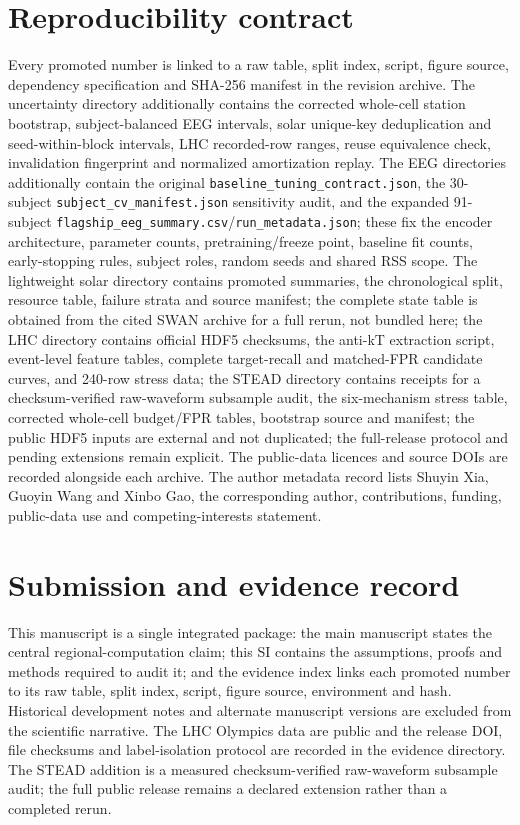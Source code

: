 \documentclass[11pt,a4paper]{article}
\numberwithin{equation}{section}
\theoremstyle{definition}\newtheorem{definition}[theorem]{Definition}
\theoremstyle{remark}\newtheorem{remark}[theorem]{Remark}
\begin{document}
\section{Reproducibility contract}
\label{sec:reprocontract}
Every promoted number is linked to a raw table, split index, script, figure source, dependency specification and SHA-256 manifest in the revision archive. The uncertainty directory additionally contains the corrected whole-cell station bootstrap, subject-balanced EEG intervals, solar unique-key deduplication and seed-within-block intervals, LHC recorded-row ranges, reuse equivalence check, invalidation fingerprint and normalized amortization replay. The EEG directories additionally contain the original \texttt{baseline\_tuning\_contract.json}, the 30-subject \texttt{subject\_cv\_manifest.json} sensitivity audit, and the expanded 91-subject \texttt{flagship\_eeg\_summary.csv}/\texttt{run\_metadata.json}; these fix the encoder architecture, parameter counts, pretraining/freeze point, baseline fit counts, early-stopping rules, subject roles, random seeds and shared RSS scope. The lightweight solar directory contains promoted summaries, the chronological split, resource table, failure strata and source manifest; the complete state table is obtained from the cited SWAN archive for a full rerun, not bundled here; the LHC directory contains official HDF5 checksums, the anti-kT extraction script, event-level feature tables, complete target-recall and matched-FPR candidate curves, and 240-row stress data; the STEAD directory contains receipts for a checksum-verified raw-waveform subsample audit, the six-mechanism stress table, corrected whole-cell budget/FPR tables, bootstrap source and manifest; the public HDF5 inputs are external and not duplicated; the full-release protocol and pending extensions remain explicit. The public-data licences and source DOIs are recorded alongside each archive. The author metadata record lists Shuyin Xia, Guoyin Wang and Xinbo Gao, the corresponding author, contributions, funding, public-data use and competing-interests statement.

\section{Submission and evidence record}
\label{sec:submissionrecord}
This manuscript is a single integrated package: the main manuscript states the central regional-computation claim; this SI contains the assumptions, proofs and methods required to audit it; and the evidence index links each promoted number to its raw table, split index, script, figure source, environment and hash. Historical development notes and alternate manuscript versions are excluded from the scientific narrative. The LHC Olympics data are public and the release DOI, file checksums and label-isolation protocol are recorded in the evidence directory. The STEAD addition is a measured checksum-verified raw-waveform subsample audit; the full public release remains a declared extension rather than a completed rerun.
\end{document}
